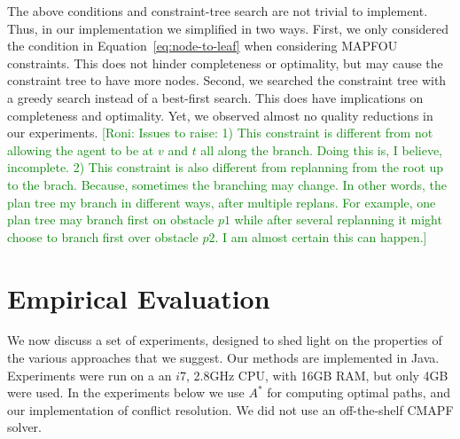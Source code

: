 \documentclass[letterpaper]{article} %
\newcommand{\roni}[1]{{\textcolor{green}{[Roni: #1]}}}
\begin{document}
The above conditions and constraint-tree search are not trivial to implement.
Thus, in our implementation we simplified in two ways.
First, we only considered the condition in Equation~\ref{eq:node-to-leaf} when considering MAPFOU constraints. This does not hinder completeness or optimality, but may cause the constraint tree to have more nodes.
Second, we searched the constraint tree with a greedy search instead of a best-first search.
This does have implications on completeness and optimality.
Yet, we observed almost no quality reductions in our experiments.
\roni{Issues to raise:
1) This constraint is different from not allowing the agent to be at $v$ and $t$ all along the branch. Doing this is, I believe, incomplete.
2) This constraint is also different from replanning from the root up to the brach. Because, sometimes the branching may change. In other words, the plan tree my branch in different ways, after multiple replans. For example, one plan tree may branch first on obstacle $p1$ while after several replanning it might choose to branch first over obstacle $p2$. I am almost certain this can happen.}
\section{Empirical Evaluation}
We now discuss a set of experiments, designed to shed light on the properties of the various approaches that we suggest. Our methods are implemented in Java. Experiments were run on a an $i7$, 2.8GHz CPU, with 16GB RAM, but only 4GB were used.
In the experiments below we use $A^*$ for computing optimal paths, and our implementation of conflict resolution. We did not use an off-the-shelf CMAPF solver.
\end{document}
